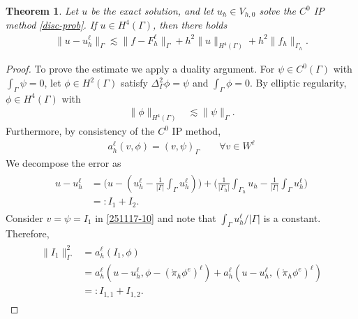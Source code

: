 \documentclass[10pt, a4paper]{amsart}
\newcommand{\calK}{\mathcal{K}}
\newtheorem{theorem}{Theorem}[section]
\theoremstyle{definition}
\theoremstyle{remark}
\theoremstyle{example}
\numberwithin{equation}{section}
\begin{document}
\begin{theorem}\label{thm:L2}
Let $u$ be the exact solution, and let $u_h \in V_{h, 0}$ solve the $C^0$ IP method \eqref{disc-prob}. If $u \in H^4(\Gamma)$, then there holds
\begin{align*}
\|u - u_h^\ell\|_{\Gamma}
\lesssim \|f - F^\ell_h\|_{\Gamma} + h^2\|u\|_{H^4(\Gamma)} + h^2\|f_h\|_{\Gamma_h}. 
\end{align*}
\end{theorem}

\begin{proof}
To prove the estimate we apply a duality argument. For $\psi \in C^0(\Gamma)$ with $\int_\Gamma \psi =0$, let $\phi \in H^2(\Gamma)$ satisfy $\Delta^2_\Gamma\phi = \psi$ and $\int_\Gamma \phi = 0$. By elliptic regularity, $\phi \in H^4(\Gamma)$ with
\begin{align}
\|\phi\|_{H^4(\Gamma)}
& \lesssim \|\psi\|_\Gamma. \label{251117-9}
\end{align}
Furthermore, by consistency of the $C^0$ IP method,
\begin{align}
a_h^\ell(v, \phi)
= (v, \psi)_\Gamma \qquad \forall v\in W^\ell %
\label{251117-10}
\end{align}
We decompose the error as
\begin{align}
\begin{split} \label{251117-11}
u - u_h^\ell
& = \Bigg(u - \left(u_h^\ell - \frac{1}{|\Gamma|}\int_\Gamma u_h^\ell\right)\Bigg) + \Bigg(\frac{1}{|\Gamma_h|}\int_{\Gamma_h}u_h - \frac{1}{|\Gamma|}\int_\Gamma u_h^\ell\Bigg) \\
& =: I_1 + I_2.
\end{split}
\end{align}
Consider $v = \psi = I_1$ in \eqref{251117-10} and note that $\int_\Gamma u_h^\ell / |\Gamma|$ is a constant. Therefore,
\begin{align}
\begin{split} \label{251117-12}
\|I_1\|_\Gamma^2
& = a_h^\ell(I_1, \phi) \\
& = a_h^\ell(u - u_h^\ell, \phi - (\mathring{\pi}_h\phi^e)^\ell) + a_h^\ell(u - u_h^\ell, (\mathring{\pi}_h\phi^e)^\ell) \\
& =: I_{1,1} + I_{1,2}.
\end{split}

\end{align}
\end{proof}
\end{document}
